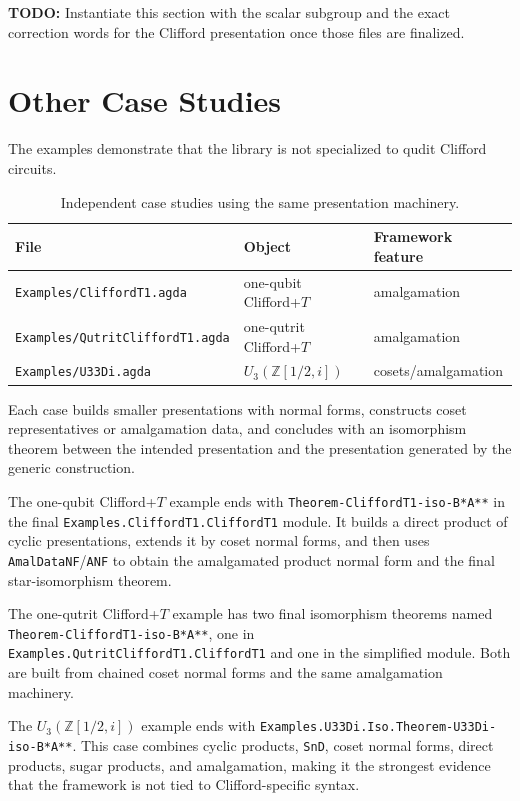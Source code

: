 \documentclass[acmsmall,screen,review,anonymous]{acmart}
\newcommand{\code}[1]{\texttt{#1}}
\newcommand{\codepath}[1]{\nolinkurl{#1}}
\newcommand{\todo}[1]{\textbf{TODO:} #1}
\begin{document}
\todo{Instantiate this section with the scalar subgroup and the exact
correction words for the Clifford presentation once those files are finalized.}

\section{Other Case Studies}
\label{sec:examples}

The examples demonstrate that the library is not specialized to qudit Clifford
circuits.

\begin{table}[tbp]
\centering
\begin{tabular}{lll}
\toprule
File & Object & Framework feature \\
\midrule
\code{Examples/CliffordT1.agda} & one-qubit Clifford+\(T\) & amalgamation \\
\code{Examples/QutritCliffordT1.agda} & one-qutrit Clifford+\(T\) & amalgamation \\
\code{Examples/U33Di.agda} & \(U_3(\mathbb{Z}[1/2,i])\) & cosets/amalgamation \\
\bottomrule
\end{tabular}
\caption{Independent case studies using the same presentation machinery.}
\label{tab:examples}
\end{table}

Each case builds smaller presentations with normal forms, constructs coset
representatives or amalgamation data, and concludes with an isomorphism theorem
between the intended presentation and the presentation generated by the generic
construction.

The one-qubit Clifford+\(T\) example ends with
\codepath{Theorem-CliffordT1-iso-B*A**} in the final
\codepath{Examples.CliffordT1.CliffordT1} module. It builds a direct product of
cyclic presentations, extends it by coset normal forms, and then uses
\code{AmalDataNF}/\code{ANF} to obtain the amalgamated product normal form and
the final star-isomorphism theorem.

The one-qutrit Clifford+\(T\) example has two final isomorphism theorems named
\codepath{Theorem-CliffordT1-iso-B*A**}, one in
\codepath{Examples.QutritCliffordT1.CliffordT1} and one in the simplified
module. Both are built from chained coset normal forms and the same
amalgamation machinery.

The \(U_3(\mathbb{Z}[1/2,i])\) example ends with
\codepath{Examples.U33Di.Iso.Theorem-U33Di-iso-B*A**}. This case combines cyclic
products, \code{SnD}, coset normal forms, direct products, sugar products, and
amalgamation, making it the strongest evidence that the framework is not tied
to Clifford-specific syntax.
\end{document}
